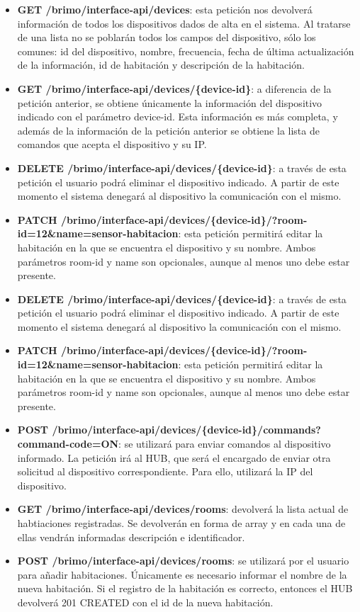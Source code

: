 \begin{itemize}
\item \textbf{GET /brimo/interface-api/devices}: esta petición nos devolverá información de todos los dispositivos
dados de alta en el sistema. Al tratarse de una lista no se poblarán todos los campos del dispositivo, sólo los comunes: id del dispositivo, nombre,
frecuencia, fecha de última actualización de la información, id de habitación y descripción de la habitación.
\item \textbf{GET /brimo/interface-api/devices/\{device-id\}}: a diferencia de la petición anterior, se obtiene únicamente la información
del dispositivo indicado con el parámetro device-id. Esta información es más completa, y además de la información de la petición anterior
se obtiene la lista de comandos que acepta el dispositivo y su IP.
\item \textbf{DELETE /brimo/interface-api/devices/\{device-id\}}: a través de esta petición el usuario podrá eliminar el dispositivo indicado. A partir
de este momento el sistema denegará al dispositivo la comunicación con el mismo.
\item \textbf{PATCH /brimo/interface-api/devices/\{device-id\}/?room-id=12\&name=sensor-habitacion}: esta petición permitirá editar la habitación
en la que se encuentra el dispositivo y su nombre. Ambos parámetros room-id y name son opcionales, aunque al menos uno debe estar presente.
\item \textbf{DELETE /brimo/interface-api/devices/\{device-id\}}: a través de esta petición el usuario podrá eliminar el dispositivo indicado. A partir
de este momento el sistema denegará al dispositivo la comunicación con el mismo.
\item \textbf{PATCH /brimo/interface-api/devices/\{device-id\}/?room-id=12\&name=sensor-habitacion}: esta petición permitirá editar la habitación
en la que se encuentra el dispositivo y su nombre. Ambos parámetros room-id y name son opcionales, aunque al menos uno debe estar presente.
\item \textbf{POST /brimo/interface-api/devices/\{device-id\}/commands?command-code=ON}: se utilizará para enviar comandos al dispositivo informado.
La petición irá al HUB, que será el encargado de enviar otra solicitud al dispositivo correspondiente. Para ello, utilizará la IP del dispositivo.
\item \textbf{GET /brimo/interface-api/devices/rooms}: devolverá la lista actual de habtiaciones registradas. Se devolverán en forma de 
array y en cada una de ellas vendrán informadas descripción e identificador.
\item \textbf{POST /brimo/interface-api/devices/rooms}: se utilizará por el usuario para añadir habitaciones. Únicamente es necesario informar
el nombre de la nueva habitación. Si el registro de la habitación es correcto, entonces el HUB devolverá 201 CREATED con el id de la nueva habitación.

\end{itemize}


